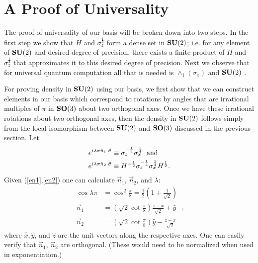 \documentclass[twocolumn,11pt]{article}
\begin{document}
\section{A Proof of Universality} 
The proof of universality of our basis will be broken down into two
steps. In the first step we show that $H$ and $\sigma_z^{\frac{1}{4}}$
form a dense set in $\mbox{\bf SU}(2)$; i.e. for any element of $\mbox{\bf
SU}(2)$ and
desired degree of precision, there exists a finite product of $H$
and $\sigma_z^\frac{1}{4}$ that approximates it to this desired
degree of precision.  Next we observe that for universal quantum
computation all that is needed is $\wedge_1(\sigma_x)$ and $\mbox{\bf SU}(2)$
\cite{egfqc}.

For proving density in $\mbox{\bf SU}(2)$ using our basis, we first show
that we can
construct elements in our basis which correspond to rotations by angles
that are irrational multiples of $\pi$ in $\mbox{\bf SO}(3)$ about two
orthogonal
axes.  Once we have these irrational rotations about two orthogonal axes,
then the density in $\mbox{\bf SU}(2)$ follows simply from the local isomorphism
between $\mbox{\bf SU}(2)$ and $\mbox{\bf SO}(3)$ discussed in the previous
section. Let
\begin{equation} \begin{align} e^{i\lambda\pi\hat{n}_1 \cdot
\vec{\sigma}}&\equiv\sigma_z^{-\frac{1}{4}}\sigma_x^{\frac{1}{4}} \;
\hbox{ and } 
\label{en1} \\ e^{i\lambda\pi\hat{n}_2 \cdot \vec{\sigma}}&\equiv
H^{-\frac{1}{2}} \label{en2}
\sigma_z^{-\frac{1}{4}}\sigma_x^{\frac{1}{4}}H^{\frac{1}{2}}. \end{align}
\end{equation} 
Given (\ref{en1},\ref{en2}) one can calculate $\vec{n}_1$,
$\vec{n}_2$, and $\lambda$: 
\begin{equation} \begin{align}
\cos\lambda\pi&=\cos^2\frac{\pi}{8}=
\frac{1}{2}(1+\frac{1}{\sqrt{2}})\label{lambda} \\
\vec{n}_1&=(\sqrt{2}\cot\frac{\pi}{8})\frac{\hat{z}-
\hat{x}}{\sqrt{2}}+\hat{y}\label{n1}\\
\vec{n}_2&=(\sqrt{2}\cot\frac{\pi}{8})\hat{y}-\frac{\hat{z}-
\hat{x}}{\sqrt{2}}\label{n2} \end{align} \ ,\end{equation} 
where $\hat{x}, \hat{y}$, and $\hat{z}$ are the unit vectors along the
respective axes.
One can easily verify that $\vec{n}_1$, $\vec{n}_2$ are orthogonal.
(These would need to be normalized when used in exponentiation.)
\end{document}
